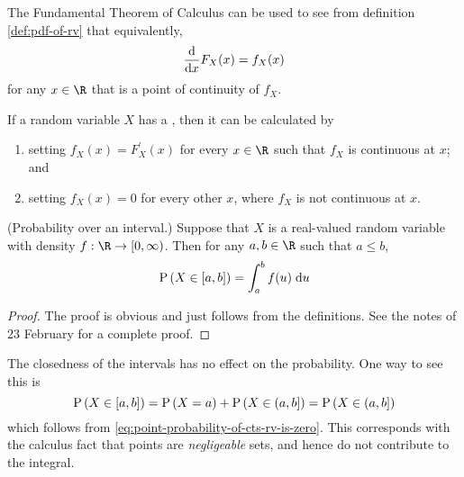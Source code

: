 \documentclass[11pt]{article}
\begin{document}
\begin{rem}
    \label{rem:pdf-of-rv-deriv}
    The Fundamental Theorem of Calculus can be used to see from definition
    \ref{def:pdf-of-rv} that equivalently,
    \begin{equation}
        \label{eq:pdf-of-rv-deriv}
        \deriv{x} F_X (x) = f_X(x)
    \end{equation}
    for any $x \in \R$ that is a point of continuity of $f_X$.
\end{rem}

\begin{rem}
    \label{rem:calculation-of-pdf}
    If a random variable $X$ has a \pdf, then it can be calculated by
    \begin{enumerate}
        \item
            setting $f_X (x) = F^\prime_X(x)$
            for every $x \in \R$ such that $f_X$ is continuous at $x$;
            and
        \item
            setting $f_X (x) = 0$ for every other $x$,
            where $f_X$ is not continuous at $x$.
    \end{enumerate}
\end{rem}

\begin{thm}{(Probability over an interval.)}
    \label{thm:prob-interval}
    Suppose that $X$ is a real-valued random variable with density
    $f : \R \to [0, \infty)$.
    Then for any $a, b \in \R$ such that $a \leq b$,
    \begin{equation}
        \label{eq:prob-interval}
        \P{X \in [a, b]}
        = \int_a^b { f(u) \intd u }
    \end{equation}
\end{thm}

\begin{proof}
    The proof is obvious and just follows from the definitions.
    See the notes of 23 February for a complete proof.
\end{proof}

\begin{rem}
    The closedness of the intervals has no effect on the probability.
    One way to see this is
    \begin{equation*}
        \P{X \in [a, b]}
        = \P{X = a} + \P{X \in (a, b]}
        = \P{X \in (a, b]}
    \end{equation*}
    which follows from \eqref{eq:point-probability-of-cts-rv-is-zero}.
    This corresponds with the calculus fact that points are \emph{negligeable}
    sets, and hence do not contribute to the integral.
\end{rem}
\end{document}
